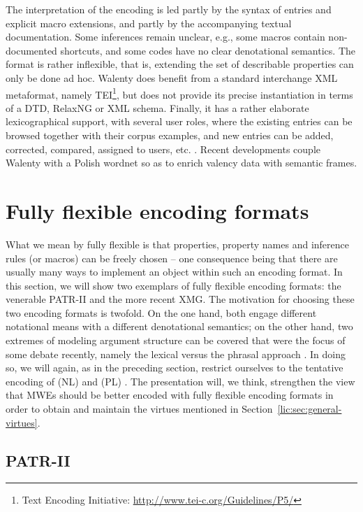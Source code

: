 \documentclass[output=paper
,modfonts
,nonflat
,biblatexbackend=biber
]{langsci/langscibook}
\begin{document}
The interpretation of the encoding is led partly by the syntax of entries and explicit macro extensions, and partly by the accompanying textual documentation. Some inferences remain unclear, e.g., some macros contain non-documented shortcuts, and some codes have no clear denotational semantics. The format is rather inflexible, that is, extending the set of describable properties can only be done ad hoc. Walenty does benefit from a standard interchange XML metaformat, namely TEI\footnote{Text Encoding Initiative: \url{http://www.tei-c.org/Guidelines/P5/}}, but does not provide its precise instantiation in terms of a DTD, RelaxNG or XML schema. Finally, it has a rather elaborate lexicographical support, with several user roles, where the existing entries can be browsed together with their corpus examples, and new entries can be added, corrected, compared, assigned to users, etc. \citep{nit:etal:16}. Recent developments couple Walenty with a Polish wordnet so as to enrich valency data with semantic frames. 

%
\section{Fully flexible encoding formats}
\label{lic:sec:fullyflexible}

What we mean by fully flexible is that properties, property names and inference rules (or macros) can
be freely chosen -- one consequence being that there are usually many ways to implement an object within such an encoding format. In this section, we will show two exemplars of fully flexible encoding formats: the venerable PATR-II and  the more recent XMG. The motivation for choosing these two encoding formats is twofold. On the one hand, both engage different notational means with a different denotational semantics; on the other hand, two extremes of modeling argument structure can be covered that were the focus of some debate recently, namely the lexical versus the phrasal approach \citep{mueller:wechsler:14}. In doing so, we will again, as in the preceding section, restrict ourselves to the tentative encoding of (NL)  and (PL) . The presentation will, we think, strengthen the view that MWEs should be better encoded with fully flexible encoding formats in order to obtain and maintain the virtues mentioned in Section~\ref{lic:sec:general-virtues}.   

\subsection{PATR-II}
\label{lic:sec:patr-datr}
\end{document}
